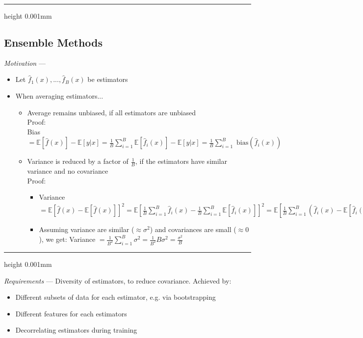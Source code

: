 {\color{black}\hrule height 0.001mm}

\subsection*{Ensemble Methods}

\emph{Motivation} ---
\begin{itemize}
    \item Let $\hat{f}_1(x), ..., \hat{f}_B(x)$ be estimators
    \item When averaging estimators...
    \begin{itemize}
        \item Average remains unbiased, if all estimators are unbiased\\
        Proof:\\
        Bias $= \mathbb{E} [ \hat{f}(x) ] - \mathbb{E} [ y | x ] = \frac{1}{B} \sum_{i=1}^B \mathbb{E} [ \hat{f}_i(x) ] - \mathbb{E} [ y | x ] = \frac{1}{B} \sum_{i=1}^B \textrm{ bias}(\hat{f}_i(x))$
        \item Variance is reduced by a factor of $\frac{1}{B}$, if the estimators have similar variance and no covariance\\
        Proof:
        \begin{itemize}
            \item Variance $= \mathbb{E} [ \hat{f}(x) - \mathbb{E} [ \hat{f}(x) ]]^2 = \mathbb{E} [ \frac{1}{B} \sum_{i=1}^B \hat{f}_i(x) - \frac{1}{B} \sum_{i=1}^B \mathbb{E} [ \hat{f}_i(x) ] ]^2 = \mathbb{E} [ \frac{1}{B} \sum_{i=1}^B (\hat{f}_i(x) - \mathbb{E} [ \hat{f}_i(x) ]) ]^2 = \frac{1}{B^2} \sum_{i=1}^B \mathbb{V} [ \hat{f}_i(x) ] + \frac{1}{B^2} \sum \sum_{i \neq j =1}^B \textrm{ Cov}[ \hat{f}_i(x), \hat{f}_j(x) ] $
            \item Assuming variance are similar ($\approx \sigma^2$) and covariances are small ($\approx 0$), we get: Variance $= \frac{1}{B^2} \sum_{i=1}^B \sigma^2 = \frac{1}{B^2} B \sigma^2 = \frac{\sigma^2}{B}$
        \end{itemize}
    \end{itemize}
\end{itemize}

{\color{lightgray}\hrule height 0.001mm}

\emph{Requirements} --- 
Diversity of estimators, to reduce covariance. Achieved by:
\begin{itemize}
    \item Different subsets of data for each estimator, e.g. via bootstrapping
    \item Different features for each estimators
    \item Decorrelating estimators during training
\end{itemize}

